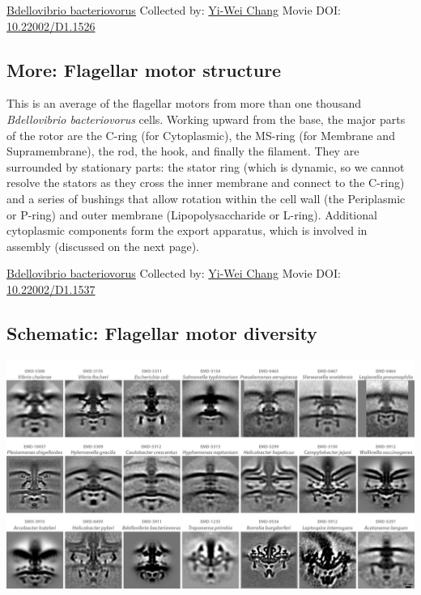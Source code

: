 \documentclass[]{tufte-book}
\begin{document}
\label{fig:6-2}\protect\hyperlink{tree}{Bdellovibrio bacteriovorus} Collected by: \protect\hyperlink{yi-wei_chang}{Yi-Wei Chang} Movie DOI: \href{https://doi.org/10.22002/D1.1526}{10.22002/D1.1526}

\hypertarget{Flagellar_motor_structure}{%
\subsection*{More: Flagellar motor structure}\label{Flagellar_motor_structure}}

This is an average of the flagellar motors from more than one thousand \emph{Bdellovibrio bacteriovorus} cells. Working upward from the base, the major parts of the rotor are the C-ring (for Cytoplasmic), the MS-ring (for Membrane and Supramembrane), the rod, the hook, and finally the filament. They are surrounded by stationary parts: the stator ring (which is dynamic, so we cannot resolve the stators as they cross the inner membrane and connect to the C-ring) and a series of bushings that allow rotation within the cell wall (the Periplasmic or P-ring) and outer membrane (Lipopolysaccharide or L-ring). Additional cytoplasmic components form the export apparatus, which is involved in assembly (discussed on the next page).



\hypertarget{htmlwidget-b0d23b9c5af19d960f3c}{}

\label{fig:6-2a}\protect\hyperlink{tree}{Bdellovibrio bacteriovorus} Collected by: \protect\hyperlink{yi-wei_chang}{Yi-Wei Chang} Movie DOI: \href{https://doi.org/10.22002/D1.1537}{10.22002/D1.1537}

\hypertarget{Flagellar_motor_diversity}{%
\subsection*{Schematic: Flagellar motor diversity}\label{Flagellar_motor_diversity}}

\includegraphics{img/schematics/6_2_1}
\end{document}
